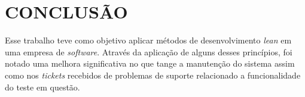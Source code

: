
\chapter{CONCLUSÃO}
\label{chap:conclusao}

Esse trabalho teve como objetivo aplicar métodos de desenvolvimento \textit{lean} em uma empresa de \textit{software}. Através da aplicação de alguns desses princípios, foi notado uma melhora significativa no que tange a manutenção do sistema assim como nos \textit{tickets} recebidos de problemas de suporte relacionado a funcionalidade do teste em questão. 

